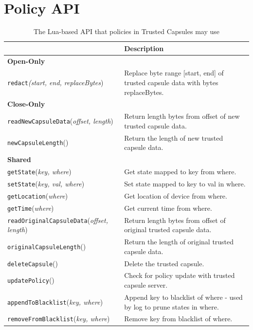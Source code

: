 \section{Policy API}
\label{subsec:policy}

\begin{table}[]
\centering
\begin{tabular}{|p{7cm}|p{5cm}|}
\hline
 & \textbf{Description} \\ \hline
\multicolumn{2}{|l|}{\textbf{Open-Only}} \\ \hline
\texttt{redact}\textit{(start, end, replaceBytes}) & Replace byte range [start, end] of trusted capsule data with bytes replaceBytes. \\ \hline
\multicolumn{2}{|l|}{\textbf{Close-Only}} \\ \hline
\texttt{readNewCapsuleData}(\textit{offset, length}) & Return length bytes from offset of new trusted capsule data. \\ \hline
\texttt{newCapsuleLength}() & Return the length of new trusted capsule data. \\ \hline
\multicolumn{2}{|l|}{\textbf{Shared}} \\ \hline
\texttt{getState}(\textit{key, where}) & Get state mapped to key from where. \\ \hline
\texttt{setState}(\textit{key, val, where}) & Set state mapped to key to val in where. \\ \hline
\texttt{getLocation}(\textit{where}) & Get location of device from where. \\ \hline
\texttt{getTime}(\textit{where}) & Get current time from where. \\ \hline
\texttt{readOriginalCapsuleData}(\textit{offset, length}) & Return length bytes from offset of original trusted capsule data. \\ \hline
\texttt{originalCapsuleLength}() & Return the length of original trusted capsule data. \\ \hline
\texttt{deleteCapsule}() & Delete the trusted capsule. \\ \hline
\texttt{updatePolicy}() & Check for policy update with trusted capsule server. \\ \hline
\texttt{appendToBlacklist}(\textit{key, where}) & Append key to blacklist of where - used by log to prune states in where. \\ \hline
\texttt{removeFromBlacklist}(\textit{key, where}) & Remove key from blacklist of where. \\ \hline
\end{tabular}%
\caption{The Lua-based API that policies in Trusted Capsules may use}
\label{Tbl:lua_ext}
\end{table}
    
